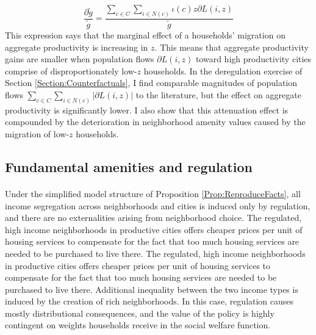 \documentclass[12pt]{article}
\begin{document}
\begin{equation}
	\frac{\partial \tilde{g}}{\tilde{g}} = \frac{\sum_{c \in C}\sum_{i \in N(c)} \iota(c)z\partial L(i,z)}{\tilde{g}}
\end{equation}
This expression says that the marginal effect of a households' migration on aggregate productivity is increasing in $z$. This means that aggregate productivity gains are smaller when population flows $\partial L(i, z)$ toward high productivity cities comprise of disproportionately low-$z$ households. In the deregulation exercise of Section \ref{Section:Counterfactuals}, I find comparable magnitudes of population flows $\sum_{c \in C}\sum_{i \in N(c)}|\partial L(i, z)|$ to the literature, but the effect on aggregate productivity is significantly lower. I also show that this attenuation effect is compounded by the deterioration in neighborhood amenity values caused by the migration of low-$z$ households.

\subsection{Fundamental amenities and regulation}\label{Theory:Externality}

\paragraph*{}
Under the simplified model structure of Proposition \ref{Prop:ReproduceFacts}, all income segregation across neighborhoods and cities is induced only by regulation, and there are no externalities arising from neighborhood choice. The regulated, high income neighborhoods in productive cities offers cheaper prices per unit of housing services to compensate for the fact that too much housing services are needed to be purchased to live there. The regulated, high income neighborhoods in productive cities offers cheaper prices per unit of housing services to compensate for the fact that too much housing services are needed to be purchased to live there. Additional inequality between the two income types is induced by the creation of rich neighborhoods. In this case, regulation causes mostly distributional consequences, and the value of the policy is highly contingent on weights households receive in the social welfare function.
\end{document}
